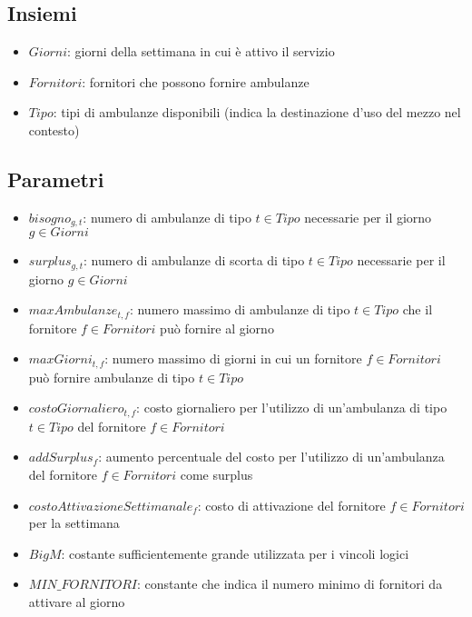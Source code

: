 \subsection{Insiemi}
\begin{itemize}
    \item $Giorni$: giorni della settimana in cui è attivo il servizio
    \item $Fornitori$: fornitori che possono fornire ambulanze
    \item $Tipo$: tipi di ambulanze disponibili (indica la destinazione d'uso del mezzo nel contesto)
\end{itemize}
\subsection{Parametri}
\begin{itemize}
    \item $bisogno_{g, t}$: numero di ambulanze di tipo $t \in Tipo$ necessarie per il giorno $g \in Giorni$
    \item $surplus_{g, t}$: numero di ambulanze di scorta di tipo $t \in Tipo$ necessarie per il giorno $g \in Giorni$
    \item $maxAmbulanze_{t, f}$: numero massimo di ambulanze di tipo $t \in Tipo$ che il fornitore $f \in Fornitori$ può fornire al giorno
    \item $maxGiorni_{t, f}$: numero massimo di giorni in cui un fornitore $f \in Fornitori$ può fornire ambulanze di tipo $t \in Tipo$
    \item $costoGiornaliero_{t, f}$: costo giornaliero per l'utilizzo di un'ambulanza di tipo $t \in Tipo$ del fornitore $f \in Fornitori$
    \item $addSurplus_{f}$: aumento percentuale del costo per l'utilizzo di un'ambulanza del fornitore $f \in Fornitori$ come surplus
    \item $costoAttivazioneSettimanale_{f}$: costo di attivazione del fornitore $f \in Fornitori$ per la settimana
    \item $BigM$: costante sufficientemente grande utilizzata per i vincoli logici
    \item $MIN\_FORNITORI$: constante che indica il numero minimo di fornitori da attivare al giorno
\end{itemize}
